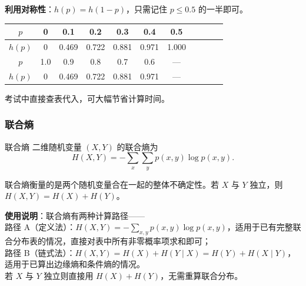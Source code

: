\textbf{利用对称性}：$h(p)=h(1-p)$，只需记住 $p\le 0.5$ 的一半即可。

\begin{center}
{\small
\begin{tabular}{c|cccccccccc}
\toprule
$p$    & 0     & 0.1   & 0.2   & 0.3   & 0.4   & 0.5 \\
\midrule
$h(p)$ & 0     & 0.469 & 0.722 & 0.881 & 0.971 & 1.000 \\
$p$    & 1.0   & 0.9   & 0.8   & 0.7   & 0.6   & --- \\
$h(p)$ & 0     & 0.469 & 0.722 & 0.881 & 0.971 & --- \\
\bottomrule
\end{tabular}
}
\end{center}

\noindent 考试中直接查表代入，可大幅节省计算时间。

\subsubsection{联合熵}
\begin{definitionBox}{联合熵}
二维随机变量 $(X,Y)$ 的联合熵为
\[
H(X,Y) = -\sum_{x}\sum_{y} p(x,y) \log p(x,y).
\]
\end{definitionBox}

联合熵衡量的是两个随机变量合在一起的整体不确定性。若 $X$ 与 $Y$ 独立，则 $H(X,Y)=H(X)+H(Y)$。

\noindent \textbf{使用说明}：联合熵有两种计算路径——\\[2pt]
路径 A（定义法）：$H(X,Y)=-\sum_{x,y}p(x,y)\log p(x,y)$，适用于已有完整联合分布表的情况，直接对表中所有非零概率项求和即可；\\
路径 B（链式法）：$H(X,Y)=H(X)+H(Y\mid X)=H(Y)+H(X\mid Y)$，适用于已算出边缘熵和条件熵的情况。\\
若 $X$ 与 $Y$ 独立则直接用 $H(X)+H(Y)$，无需重算联合分布。

